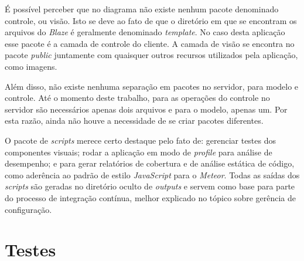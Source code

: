 É possível perceber que no diagrama não existe nenhum pacote denominado controle, ou visão. Isto se deve ao fato de que o diretório em que se encontram os arquivos do \textit{Blaze} é geralmente denominado \textit{template}. No caso desta aplicação esse pacote é a camada de controle do cliente. A camada de visão se encontra no pacote \textit{public} juntamente com quaisquer outros recursos utilizados pela aplicação, como imagens.

Além disso, não existe nenhuma separação em pacotes no servidor, para modelo e controle. Até o momento deste trabalho, para as operações do controle no servidor são necessários apenas dois arquivos e para o modelo, apenas um. Por esta razão, ainda não houve a necessidade de se criar pacotes diferentes.

O pacote de \textit{scripts} merece certo destaque pelo fato de: gerenciar testes dos componentes visuais; rodar a aplicação em modo de \textit{profile} para análise de desempenho; e para gerar relatórios de cobertura e de análise estática de código, como aderência ao padrão de estilo \textit{JavaScript} para o \textit{Meteor}. Todas as saídas dos \textit{scripts} são geradas no diretório oculto de \textit{outputs} e servem como base para parte do processo de integração contínua, melhor explicado no tópico sobre gerência de configuração.

\section{Testes}

